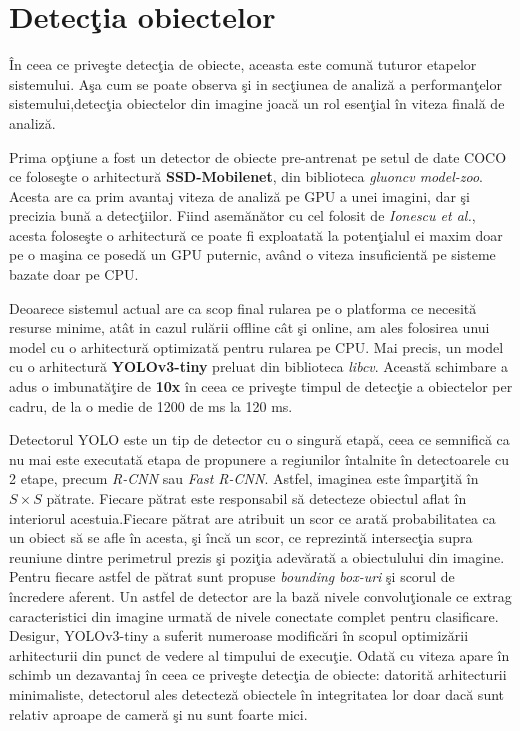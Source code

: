 \documentclass[a4paper,12pt]{report}
\begin{document}
\section{Detecţia obiectelor}
\par În ceea ce priveşte detecţia de obiecte, aceasta este comună tuturor etapelor sistemului. Aşa cum se poate observa şi in secţiunea de analiză a performanţelor sistemului,detecţia obiectelor din imagine joacă un rol esenţial în viteza finală de analiză. 
\par Prima opţiune a fost un detector de obiecte pre-antrenat pe setul de date COCO ce foloseşte o arhitectură \textbf{SSD-Mobilenet}, din biblioteca \emph {gluoncv model-zoo}. Acesta are ca prim avantaj viteza de analiză pe GPU a unei imagini, dar şi precizia bună a detecţiilor. Fiind asemănător cu cel folosit de \emph{Ionescu et al.}, acesta foloseşte o arhitectură ce poate fi exploatată la potenţialul ei maxim doar pe o maşina ce posedă un GPU puternic, având o viteza insuficientă pe sisteme bazate doar pe CPU. 
\par Deoarece sistemul actual are ca scop final rularea pe o platforma ce necesită resurse minime, atât in cazul rulării offline cât şi online, am ales folosirea unui model cu o arhitectură optimizată pentru rularea pe CPU. Mai precis, un model cu o arhitectură \textbf{YOLOv3-tiny} preluat din biblioteca \emph{libcv}.
Această schimbare a adus o imbunatăţire de \textbf{10x} în ceea ce priveşte timpul de detecţie a obiectelor per cadru, de la o medie de  1200 de ms la 120 ms.
\par Detectorul YOLO este un tip de detector cu o singură etapă, ceea ce semnifică ca nu mai este executată etapa de propunere a regiunilor întalnite în detectoarele cu 2 etape, precum \emph{R-CNN} sau \emph{Fast R-CNN}. Astfel, imaginea este împarţită în \( S \times S \) pătrate. Fiecare pătrat este responsabil să detecteze obiectul aflat în interiorul acestuia.Fiecare pătrat are atribuit un scor ce arată probabilitatea ca un obiect să se afle în acesta, şi încă un scor, ce reprezintă intersecţia supra reuniune dintre perimetrul prezis şi poziţia adevărată a obiectulului din imagine.   Pentru fiecare astfel de pătrat sunt propuse \emph{bounding box-uri} şi scorul de încredere aferent. Un astfel de detector are la bază nivele convoluţionale ce extrag caracteristici din imagine urmată de nivele conectate complet pentru clasificare. Desigur, YOLOv3-tiny a suferit numeroase modificări în scopul optimizării arhitecturii din punct de vedere al timpului de execuţie.\cite{jiao2019}
Odată cu viteza apare în schimb un dezavantaj în ceea ce priveşte detecţia de obiecte: datorită arhitecturii minimaliste, detectorul ales detecteză obiectele în integritatea lor doar dacă sunt relativ aproape de cameră şi nu sunt foarte mici. 
\end{document}
